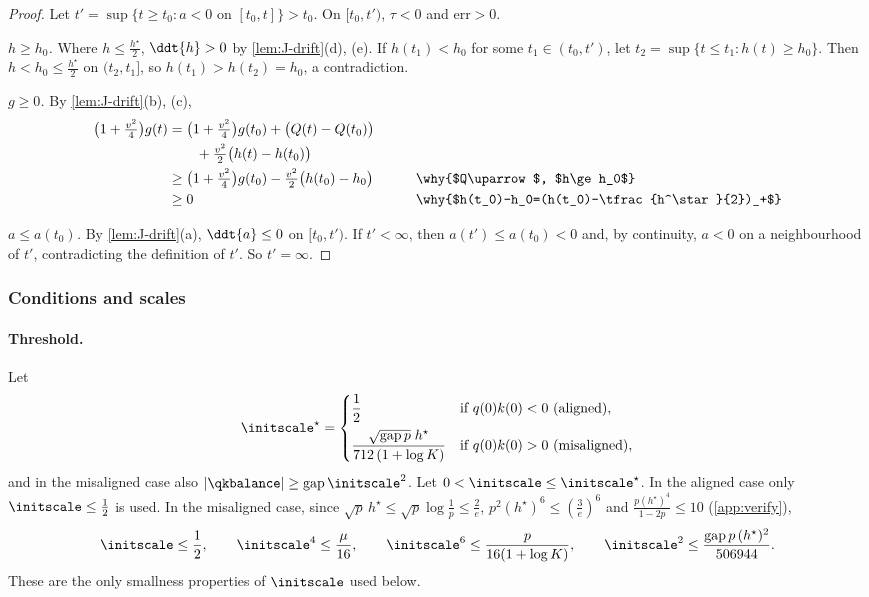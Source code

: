 \begin{proof}
Let $t'=\sup\{t\ge t_0:a<0\text{ on }[t_0,t]\}>t_0$. On $[t_0,t')$, $\tau<0$ and $\mathrm{err}>0$.

\emph{$h\ge h_0$.} Where $h\le\frac{h^\star}{2}$, $\ddt{h}>0$ by \cref{lem:J-drift}(d), (e). If $h(t_1)<h_0$ for some $t_1\in(t_0,t')$, let
$t_2=\sup\{t\le t_1:h(t)\ge h_0\}$. Then $h<h_0\le\frac{h^\star}{2}$ on $(t_2,t_1]$, so $h(t_1)>h(t_2)=h_0$, a contradiction.

\emph{$g\ge0$.} By \cref{lem:J-drift}(b), (c),
\begin{alignat*}{2}
 \bigl(1+\tfrac{v^2}{4}\bigr)g(t)&=\bigl(1+\tfrac{v^2}{4}\bigr)g(t_0)+\bigl(Q(t)-Q(t_0)\bigr) &\qquad&\\
 &\qquad+\tfrac{v^2}{2}\bigl(h(t)-h(t_0)\bigr)\\
 &\ge\bigl(1+\tfrac{v^2}{4}\bigr)g(t_0)-\tfrac{v^2}{2}\bigl(h(t_0)-h_0\bigr) && \why{$Q\uparrow$, $h\ge h_0$}\\
 &\ge0 && \why{$h(t_0)-h_0=(h(t_0)-\tfrac{h^\star}{2})_+$}
\end{alignat*}

\emph{$a\le a(t_0)$.} By \cref{lem:J-drift}(a), $\ddt{a}\le0$ on $[t_0,t')$. If $t'<\infty$, then $a(t')\le a(t_0)<0$ and, by continuity, $a<0$ on a
neighbourhood of $t'$, contradicting the definition of $t'$. So $t'=\infty$.
\end{proof}

\subsubsection{Conditions and scales}
\label{app:J-constants}

\paragraph{Threshold.} Let
\[
 \initscale^\star=\begin{cases}\dfrac{1}{2}&\text{if }q(0)k(0)<0\ \text{(aligned)},\\[8pt]
 \dfrac{\sqrt{\mathrm{gap}\,p}\;h^\star}{712\,(1+\log K)}&\text{if }q(0)k(0)>0\ \text{(misaligned)},\end{cases}
\]
and in the misaligned case also $|\qkbalance|\ge\mathrm{gap}\,\initscale^2$. Let $0<\initscale\le\initscale^\star$. In the aligned case only $\initscale\le\frac{1}{2}$ is used.
In the misaligned case, since $\sqrt p\,h^\star\le\sqrt p\log\frac{1}{p}\le\frac{2}{e}$, $p^2(h^\star)^6\le(\frac{3}{e})^6$ and $\frac{p(h^\star)^4}{1-2p}\le10$
(\cref{app:verify}),
\begin{equation}
 \initscale\le\frac{1}{2},\qquad \initscale^4\le\frac{\mu}{16},\qquad \initscale^6\le\frac{p}{16(1+\log K)},\qquad
 \initscale^2\le\frac{\mathrm{gap}\,p\,(h^\star)^2}{506944}.
 \label{eq:J-eps}
\end{equation}
These are the only smallness properties of $\initscale$ used below.

